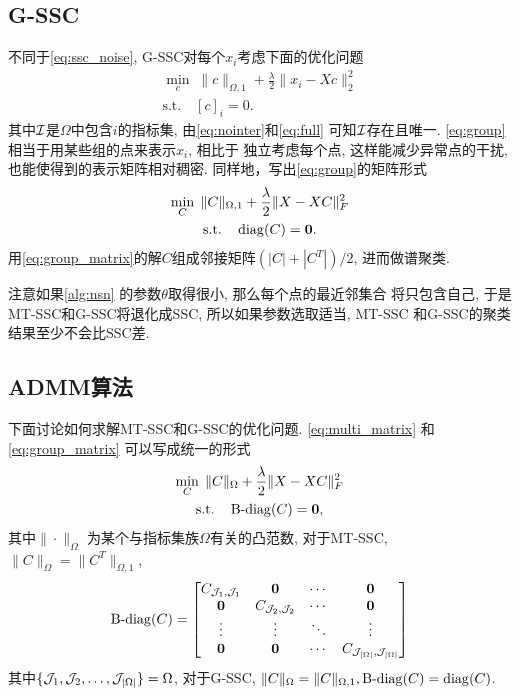\subsection{G-SSC}
不同于\eqref{eq:ssc_noise}, G-SSC对每个\(x_i\)考虑下面的优化问题
\begin{equation}
  \begin{gathered}
    \min_{c} \; \|c\|_{\Omega, 1} + \frac{\lambda}{2} \|x_i - Xc\|_2^2\\
    \text{s.t.} \quad [c]_i = 0.
  \end{gathered}
  \label{eq:group}
\end{equation}
其中\(\mathcal{I}\)是\(\Omega\)中包含\(i\)的指标集, 由\eqref{eq:nointer}和\eqref{eq:full}
可知\(\mathcal{I}\)存在且唯一. \eqref{eq:group}相当于用某些组的点来表示\(x_i\), 相比于
独立考虑每个点, 这样能减少异常点的干扰, 也能使得到的表示矩阵相对稠密.
同样地，写出\eqref{eq:group}的矩阵形式
\begin{equation}
  \begin{gathered}
    \min_C\; \|C\|_{\Omega, 1} + \frac{\lambda}{2} \|X-XC\|_F^2 \\
    \text{s.t.} \quad \operatorname{diag}(C) = \mathbf{0}.
  \end{gathered}
  \label{eq:group_matrix}
\end{equation}
用\eqref{eq:group_matrix}的解\(C\)组成邻接矩阵\((|C|+|C^T|)/2\), 进而做谱聚类.

注意如果\autoref{alg:nsn} 的参数\(\theta\)取得很小, 那么每个点的最近邻集合
将只包含自己, 于是MT-SSC和G-SSC将退化成SSC, 所以如果参数选取适当, MT-SSC
和G-SSC的聚类结果至少不会比SSC差.

\subsection{ADMM算法}
下面讨论如何求解MT-SSC和G-SSC的优化问题.
\eqref{eq:multi_matrix} 和 \eqref{eq:group_matrix} 可以写成统一的形式
\begin{equation}\label{eq:MatrixLasso}
  \begin{gathered}
    \min_{C} \; \|C\|_{\Omega}+\frac{\lambda}{2}\|X-XC\|_F^2  \\
    \text{s.t.} \quad \operatorname{B-diag}(C)=\mathbf{0},
  \end{gathered}
\end{equation}
其中\(\|\cdot\|_{\Omega}\) 为某个与指标集族\(\Omega\)有关的凸范数,
对于MT-SSC, \(\|C\|_{\Omega}=\|C^T\|_{\Omega, 1}\), 
\[
  \operatorname{B-diag}(C)=\begin{bmatrix}
    C_{\mathcal{J}_1, \mathcal{J}_1}  & \mathbf{0} & \cdots & \mathbf{0} \\
    \mathbf{0}  & C_{\mathcal{J}_2, \mathcal{J}_2} & \cdots & \mathbf{0} \\
    \vdots   &    \vdots    &    \ddots     & \vdots \\
    \mathbf{0}  &  \mathbf{0} &  \cdots  & C_{\mathcal{J}_{|\Omega|},\mathcal{J}_{|\Omega|}}
  \end{bmatrix}
\]
其中\(\{\mathcal{J}_1, \mathcal{J}_2,\ldots,\mathcal{J}_{|\Omega|}\}=\Omega\),
对于G-SSC, \(\|C\|_{\Omega}=\|C\|_{\Omega, 1}, \operatorname{B-diag}(C) = \operatorname{diag}(C)\).

